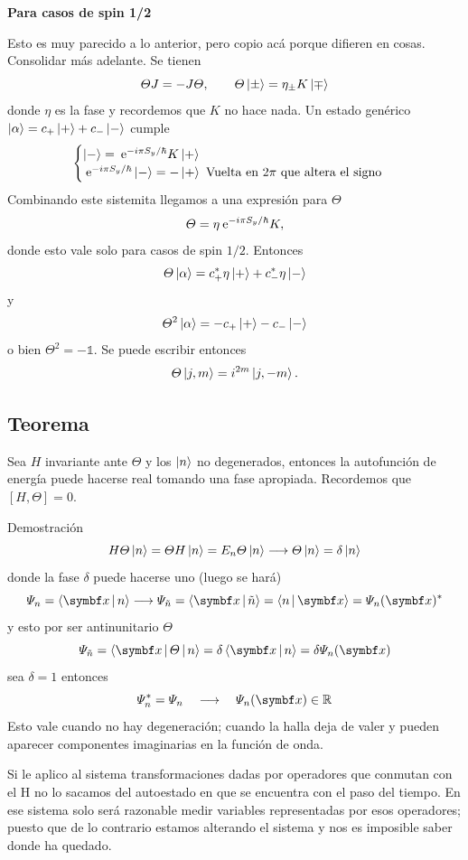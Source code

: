 \documentclass[10pt,oneside]{CBFT_book}
\begin{document}
\begin{ejemplo}{\bf Para casos de spin 1/2}

Esto es muy parecido a lo anterior, pero copio acá porque difieren en cosas. Consolidar más adelante.
Se tienen
\[
	\Theta J = - J \Theta, \qquad \Theta\Ket{\pm}  = \eta_{\pm} K \Ket{\mp}
\]
donde $\eta$ es la fase y recordemos que $K$ no hace nada. 
Un estado genérico $\Ket{\alpha} = c_+ \Ket{+} + c_- \Ket{-}$ cumple
\[
	\begin{cases}
		\Ket{-} = \:\mathrm{e}^{ - i \pi S_y / \hbar } K \Ket{+} \\
		\:\mathrm{e}^{ - i \pi S_y / \hbar } \Ket{-} = - \Ket{+} \text{ Vuelta en $2\pi$ que altera el signo} 
	\end{cases}
\]
Combinando este sistemita llegamos a una expresión para $\Theta$
\[
	\Theta = \eta \:\mathrm{e}^{ - i \pi S_y / \hbar } K,
\]
donde esto vale solo para casos de spin $1/2$. Entonces
\[
	\Theta\Ket{\alpha} = c_+^* \eta \Ket{+} + c_-^* \eta \Ket{-}
\]
y
\[
	\Theta^2 \Ket{\alpha} = -c_+ \Ket{+} - c_- \Ket{-}
\]
o bien $\Theta^2 = - \mathbb{1}$. Se puede escribir entonces
\[
	\Theta\Ket{j,m} = i^{2m} \Ket{j,-m} .
\]
\end{ejemplo}


\subsection{Teorema}

Sea $H$ invariante ante $\Theta$ y los $\Ket{n}$ no degenerados, entonces la autofunción de energía puede 
hacerse real tomando una fase apropiada.
Recordemos que $[H,\Theta]=0$.

Demostración 
\[
	H\Theta\Ket{n} = \Theta H \Ket{n} = E_n \Theta \Ket{n} \longrightarrow \Theta \Ket{n} = \delta\Ket{n}
\]
donde la fase $\delta$ puede hacerse uno (luego se hará)
\[
	\Psi_n = \Braket{\vb{x}|n} \longrightarrow \Psi_{\tilde{n}} = \Braket{\vb{x}|\tilde{n}} =
	\Braket{n|\vb{x}} = \Psi_n (\vb{x})^*
\]
y esto por ser antinunitario $\Theta$
\[
	\Psi_{\tilde{n}} = \Braket{\vb{x}|\Theta|n} = \delta\Braket{\vb{x}|n} = \delta\Psi_n(\vb{x})
\]
sea $\delta = 1 $ entonces 
\[
	\Psi_n^* = \Psi_n \quad \longrightarrow \quad \Psi_n(\vb{x}) \in \mathbb{R} 
\]
Esto vale cuando no hay degeneración; cuando la halla deja de valer y pueden aparecer componentes
imaginarias en la función de onda.

Si le aplico al sistema transformaciones dadas por operadores que conmutan con el H no lo sacamos del 
autoestado en que se encuentra con el paso del tiempo.
En ese sistema solo será razonable medir variables representadas por esos operadores; puesto que de lo 
contrario estamos alterando el sistema y nos es imposible saber donde ha quedado.
\end{document}
